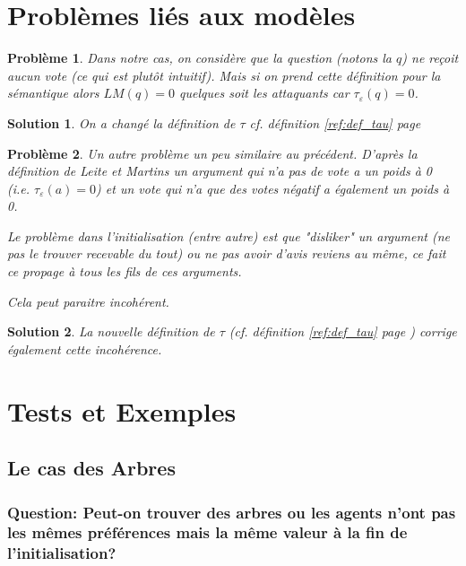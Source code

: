 \documentclass[12pt]{article}
\theoremstyle{defi}
\theoremstyle{not}
\theoremstyle{prob}
\newtheorem{problem}{Problème}[section]
\newtheorem{solution}{Solution}[problem]
\begin{document}
  \section{Problèmes liés aux modèles}
    \begin{problem}
      Dans notre cas, on considère que la question (notons la $q$) ne reçoit aucun vote (ce qui est plutôt intuitif). Mais si on prend cette définition pour la sémantique alors $LM(q) = 0$ quelques soit les attaquants car $\tau_\varepsilon(q) = 0$.
    \end{problem}

    \begin{solution}
      On a changé la définition de $\tau$ cf. définition \ref{ref:def_tau} page \pageref{ref:def_tau}
    \end{solution}

    \begin{problem}
      Un autre problème un peu similaire au précédent.
      D'après la définition de Leite et Martins un argument qui n'a pas de vote a un poids à 0 (i.e. $\tau_\varepsilon (a) = 0$) et un vote qui n'a que des votes négatif a également un poids à 0.

      Le problème dans l'initialisation (entre autre) est que "disliker" un argument (ne pas le trouver recevable du tout) ou ne pas avoir d'avis reviens au même, ce fait ce propage à tous les fils de ces arguments.

      Cela peut paraitre incohérent.
    \end{problem}

    \begin{solution}
      La nouvelle définition de $\tau$ (cf. définition \ref{ref:def_tau} page \pageref{ref:def_tau}) corrige également cette incohérence.
    \end{solution}


  \section{Tests et Exemples}
    \subsection{Le cas des Arbres}
      \subsubsection{Question: Peut-on trouver des arbres ou les agents n'ont pas les mêmes préférences mais la même valeur à la fin de l'initialisation?\newline}
\end{document}
